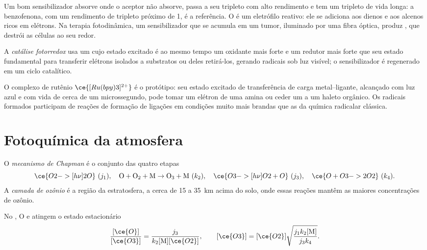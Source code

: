 Um bom sensibilizador absorve onde o aceptor não absorve, passa a seu tripleto
com alto rendimento e tem um tripleto de vida longa: a benzofenona, com um
rendimento de tripleto próximo de 1, é a referência. O  é um
eletrófilo reativo: ele se adiciona aos dienos e aos alcenos ricos em elétrons. Na
terapia fotodinâmica, um sensibilizador que se acumula em um tumor, iluminado por
uma fibra óptica, produz , que destrói as células ao seu redor.

\begin{definition}\label{def:b3:photochemistry:photoredox}
A \emph{catálise fotorredox} usa um 
cujo estado excitado é ao mesmo tempo um oxidante mais forte e um redutor mais
forte que seu estado fundamental para transferir elétrons isolados a substratos ou
deles retirá-los, gerando radicais sob luz visível; o sensibilizador é regenerado
em um ciclo catalítico.
\end{definition}

O complexo de rutênio $\ce{[Ru(bpy)3]^{2+}}$ é o protótipo: seu estado excitado de
transferência de carga metal--ligante, alcançado com luz azul e com vida de cerca
de um microssegundo, pode tomar um elétron de uma amina ou ceder um a um haleto
orgânico. Os radicais formados participam de reações de formação de ligações em
condições muito mais brandas que as da química radicalar clássica.

\section{Fotoquímica da atmosfera}

\begin{definition}\label{def:b3:photochemistry:chapman}
O \emph{mecanismo de Chapman} é o conjunto das quatro etapas
\[
  \ce{O2 ->[h\nu] 2 O}\ (j_1), \quad \mathrm{O + O_2 + M \to O_3 + M}\ (k_2), \quad
  \ce{O3 ->[h\nu] O2 + O}\ (j_3), \quad \ce{O + O3 -> 2 O2}\ (k_4).
\]
A \emph{camada de ozônio} é a região da estratosfera, a cerca
de 15 a \qty{35}{km} acima do solo, onde essas reações mantêm as maiores
concentrações de ozônio.
\end{definition}

\begin{theorem}\label{thm:b3:photochemistry:chapman}
No , O e  atingem o estado estacionário
\[
  \frac{[\ce{O}]}{[\ce{O3}]} = \frac{j_3}{k_2[\mathrm M][\ce{O2}]}, \qquad
  [\ce{O3}] = [\ce{O2}]\sqrt{\frac{j_1k_2[\mathrm M]}{j_3k_4}} .
\]
\end{theorem}

